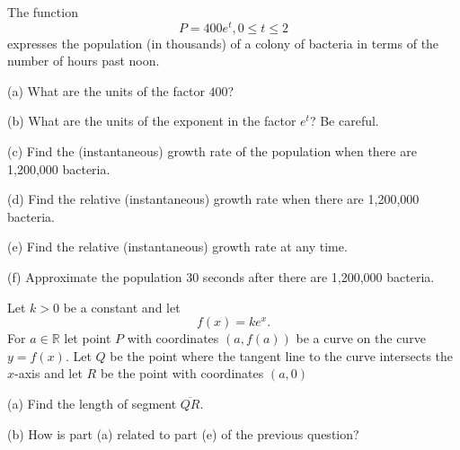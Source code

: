 \documentclass{ximera}
\begin{document}
\begin{question}  \label{Qdefrt4trt}
The function 
\[
    P = 400 e^t , 0\leq t \leq 2
\]
expresses the population (in thousands) of a colony of bacteria in terms of the number of hours past noon.

(a) What are the units of the factor $400$?

(b) What are the units of the exponent in the factor $e^t$? Be careful.

(c) Find the (instantaneous) growth rate of the population when there are 1,200,000 bacteria.

(d) Find the relative (instantaneous) growth rate when there are 1,200,000 bacteria.

(e) Find the  relative (instantaneous) growth rate at any time.

(f) Approximate the population $30$ seconds after there are 1,200,000 bacteria.
\end{question}


\begin{question}  \label{Qdfdsf4thn}
Let $k>0$ be a constant and let
\[
     f(x) = k e^x .
\]
For $a\in \mathbb{R}$ let point $P$ with coordinates $(a, f(a))$ be a curve on the curve$y=f(x)$. Let $Q$ be the point where the tangent line to the curve intersects the $x$-axis and let $R$ be the point with coordinates $(a,0)$

(a) Find the length of segment $\overline{QR}$.

(b) How is part (a) related to part (e) of the previous question?

\end{question}
\end{document}
